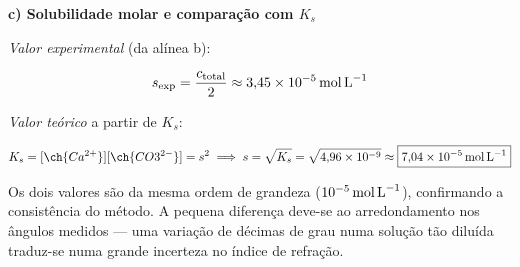 \documentclass[12pt,a4paper]{article}
\begin{document}
\bigskip

\begin{mdframed}[style=resolucao]
\textbf{c) Solubilidade molar e comparação com $K_s$}

\medskip

\textit{Valor experimental} (da alínea b):

\[
  s_{\text{exp}} = \frac{c_{\text{total}}}{2} \approx 3{,}45 \times 10^{-5}\,\text{mol\,L}^{-1}
\]

\textit{Valor teórico} a partir de $K_s$:

\[
  K_s = [\ch{Ca^{2+}}][\ch{CO3^{2-}}] = s^2
  \implies s = \sqrt{K_s} = \sqrt{4{,}96 \times 10^{-9}}
  \approx \boxed{7{,}04 \times 10^{-5}\,\text{mol\,L}^{-1}}
\]

\medskip

Os dois valores são da mesma ordem de grandeza ($10^{-5}\,\text{mol\,L}^{-1}$),
confirmando a consistência do método. A pequena diferença deve-se ao
arredondamento nos ângulos medidos --- uma variação de décimas de grau numa
solução tão diluída traduz-se numa grande incerteza no índice de refração.
\end{mdframed}
\end{document}
